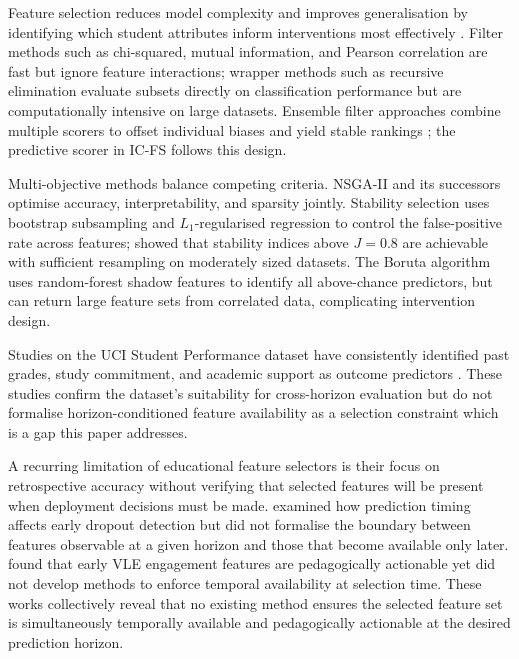 \documentclass[a4paper,fleqn]{cas-sc}
\begin{document}
Feature selection reduces model complexity and improves generalisation by identifying which student attributes inform interventions most effectively \citep{marquez2016,conijn2017}. Filter methods such as chi-squared, mutual information, and Pearson correlation are fast but ignore feature interactions; wrapper methods such as recursive elimination evaluate subsets directly on classification performance but are computationally intensive on large datasets. Ensemble filter approaches combine multiple scorers to offset individual biases and yield stable rankings \citep{meinshausen2010}; the predictive scorer in IC-FS follows this design.
 
Multi-objective methods balance competing criteria. NSGA-II \citep{deb2002} and its successors optimise accuracy,
interpretability, and sparsity jointly. Stability selection \citep{meinshausen2010} uses bootstrap subsampling and $L_1$-regularised regression to control the false-positive rate across features; \citet{nogueira2018} showed that stability indices above $J = 0.8$ are achievable with sufficient resampling on moderately sized
datasets. The Boruta algorithm \citep{kursa2010} uses random-forest shadow features to identify all above-chance predictors, but can return large feature sets from correlated data, complicating intervention design.
 
Studies on the UCI Student Performance dataset \citep{cortez2008} have consistently identified past grades, study commitment, and academic support
as outcome predictors \citep{marquez2016,conijn2017}. These studies confirm the dataset's suitability for cross-horizon evaluation but do not formalise horizon-conditioned feature availability as a selection constraint which is a gap this paper addresses.
 
A recurring limitation of educational feature selectors is their focus on retrospective accuracy without verifying that selected features will be
present when deployment decisions must be made. \citet{chen2020} examined how prediction timing affects early dropout detection but did not formalise the boundary between features observable at a given horizon and those that become available only later. \citet{waheed2020} found that early VLE engagement features are pedagogically actionable yet did not develop methods to enforce temporal availability at selection time.
These works collectively reveal that no existing method ensures the selected feature set is simultaneously temporally available and pedagogically actionable at the desired prediction horizon.
 
\end{document}
